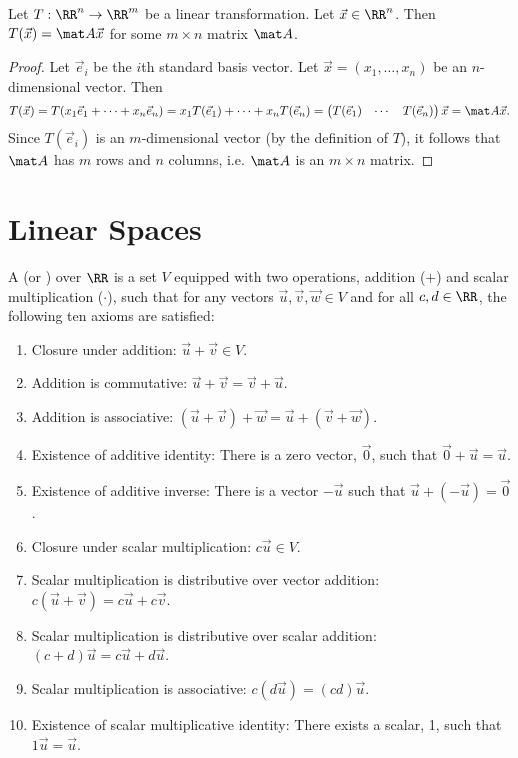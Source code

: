 \begin{proposition}
    Let $T : \RR^n \to \RR^m$ be a linear transformation. Let $\vec x \in \RR^n$. Then $T(\vec x) = \mat A \vec x$ for some $m \times n$ matrix $\mat A$.
\end{proposition}
\begin{proof}
    Let $\vec e_i$ be the $i$th standard basis vector. Let $\vec x = (x_1, \dots, x_n)$ be an $n$-dimensional vector. Then \[T(\vec x) = T(x_1 \vec e_1 + \dots + x_n \vec e_n) = x_1 T(\vec e_1) + \dots + x_n T(\vec e_n) = \begin{pmatrix}T(\vec e_1) & \cdots & T(\vec e_n)\end{pmatrix} \vec x = \mat A \vec x.\] Since $T(\vec e_i)$ is an $m$-dimensional vector (by the definition of $T$), it follows that $\mat A$ has $m$ rows and $n$ columns, i.e. $\mat A$ is an $m \times n$ matrix.
\end{proof}

\section{Linear Spaces}

\begin{definition}
    A  (or ) over $\RR$ is a set $V$ equipped with two operations, addition ($+$) and scalar multiplication ($\cdot$), such that for any vectors $\vec u, \vec v, \vec w \in V$ and for all $c, d \in \RR$, the following ten axioms are satisfied:
    \renewcommand{\theenumi}{\arabic{enumi}.}%
    \begin{enumerate}
        \item Closure under addition: $\vec u + \vec v \in V$.
        \item Addition is commutative: $\vec u + \vec v = \vec v + \vec u$.
        \item Addition is associative: $(\vec u + \vec v) + \vec w = \vec u + (\vec v + \vec w)$.
        \item Existence of additive identity: There is a zero vector, $\vec 0$, such that $\vec 0 + \vec u = \vec u$.
        \item Existence of additive inverse: There is a vector $-\vec u$ such that $\vec u + (-\vec u) = \vec 0$.
        \item Closure under scalar multiplication: $c\vec u \in V$.
        \item Scalar multiplication is distributive over vector addition: $c(\vec u + \vec v) = c \vec u + c \vec v$.
        \item Scalar multiplication is distributive over scalar addition: $(c + d) \vec u = c \vec u + d \vec u$.
        \item Scalar multiplication is associative: $c(d \vec u) = (cd) \vec u$.
        \item Existence of scalar multiplicative identity: There exists a scalar, 1, such that $1 \vec u = \vec u$.
    \end{enumerate}
    \renewcommand{\theenumi}{(\alph{enumi})}
\end{definition}

